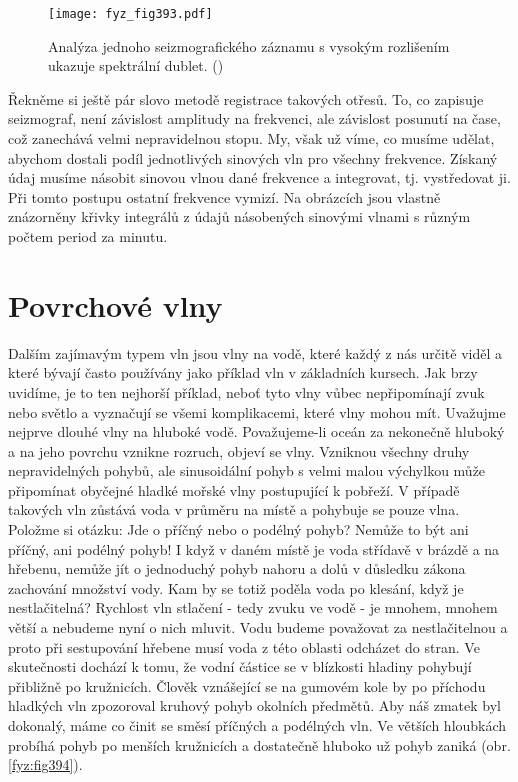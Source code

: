 {  \begin{figure}[ht!] %
    \centering
    \texttt{[image: fyz\_fig393.pdf]}
    \caption{Analýza jednoho seizmografického záznamu s vysokým rozlišením ukazuje spektrální 
             dublet.
             (\cite[s.~694]{Feynman01})}
    \label{fyz:fig393}
  \end{figure}
  
  Řekněme si ještě pár slovo metodě registrace takových otřesů. To, co zapisuje seizmograf, není 
  závislost amplitudy na frekvenci, ale závislost posunutí na čase, což zanechává velmi 
  nepravidelnou stopu. My, však už víme, co musíme udělat, abychom dostali podíl jednotlivých 
  sinových vln pro všechny frekvence. Získaný údaj musíme násobit sinovou vlnou dané frekvence a 
  integrovat, tj. vystředovat ji. Při tomto postupu ostatní frekvence vymizí. Na obrázcích jsou 
  vlastně znázorněny křivky integrálů z údajů násobených sinovými vlnami s různým počtem period za 
  minutu.
  
\section{Povrchové vlny}\label{fyz:IchapLIsecIV}
  Dalším zajímavým typem vln jsou vlny na vodě, které každý z nás určitě viděl a které bývají často 
  používány jako příklad vln v základních kursech. Jak brzy uvidíme, je to ten nejhorší příklad, 
  neboť tyto vlny vůbec nepřipomínají zvuk nebo světlo a vyznačují se všemi komplikacemi, které 
  vlny mohou mít. Uvažujme nejprve dlouhé vlny na hluboké vodě. Považujeme-li oceán za nekonečně 
  hluboký a na jeho povrchu vznikne rozruch, objeví se vlny. Vzniknou všechny druhy nepravidelných 
  pohybů, ale sinusoidální pohyb s velmi malou výchylkou může připomínat obyčejné hladké mořské 
  vlny postupující k pobřeží. V případě takových vln zůstává voda v průměru na místě a pohybuje se 
  pouze vlna. Položme si otázku: Jde o příčný nebo o podélný pohyb? Nemůže to být ani příčný, ani 
  podélný pohyb! I když v daném místě je voda střídavě v brázdě a na hřebenu, nemůže jít o 
  jednoduchý pohyb nahoru a dolů v důsledku zákona zachování množství vody. Kam by se totiž poděla 
  voda po klesání, když je nestlačitelná? Rychlost vln stlačení - tedy zvuku ve vodě - je mnohem, 
  mnohem větší a nebudeme nyní o nich mluvit. Vodu budeme považovat za nestlačitelnou a proto při 
  sestupování hřebene musí voda z této oblasti odcházet do stran. Ve skutečnosti dochází k tomu, že 
  vodní částice se v blízkosti hladiny pohybují přibližně po kružnicích. Člověk vznášející se 
  na gumovém kole by po příchodu hladkých vln zpozoroval kruhový pohyb okolních předmětů. Aby náš 
  zmatek byl dokonalý, máme co činit se směsí příčných a podélných vln. Ve větších hloubkách 
  probíhá pohyb po menších kružnicích a dostatečně hluboko už pohyb zaniká (obr. \ref{fyz:fig394}).
  
}

